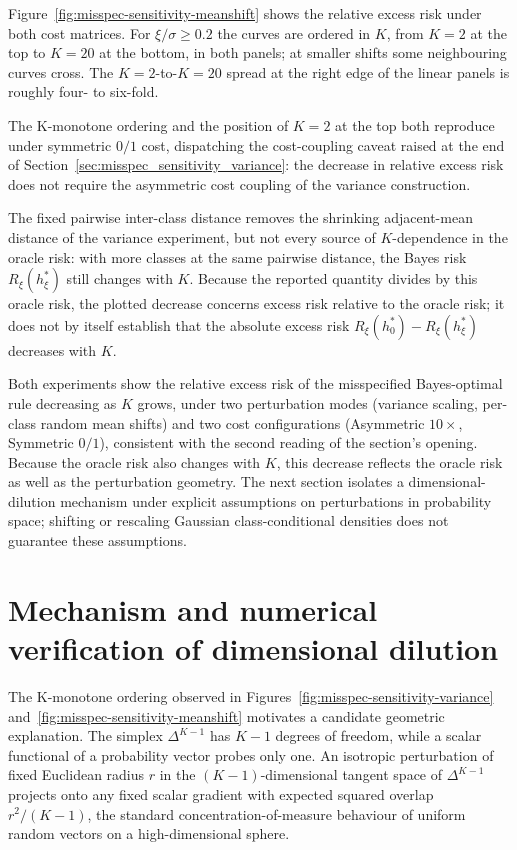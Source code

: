 Figure~\ref{fig:misspec-sensitivity-meanshift} shows the relative excess risk under both cost matrices. For $\xi/\sigma \ge 0.2$ the curves are ordered in $K$, from $K = 2$ at the top to $K = 20$ at the bottom, in both panels; at smaller shifts some neighbouring curves cross. The $K=2$-to-$K=20$ spread at the right edge of the linear panels is roughly four- to six-fold.

The K-monotone ordering and the position of $K = 2$ at the top both reproduce under symmetric $0/1$ cost, dispatching the cost-coupling caveat raised at the end of Section~\ref{sec:misspec_sensitivity_variance}: the decrease in relative excess risk does not require the asymmetric cost coupling of the variance construction.

The fixed pairwise inter-class distance removes the shrinking adjacent-mean distance of the variance experiment, but not every source of $K$-dependence in the oracle risk: with more classes at the same pairwise distance, the Bayes risk $R_\xi(h^*_\xi)$ still changes with $K$. Because the reported quantity divides by this oracle risk, the plotted decrease concerns excess risk relative to the oracle risk; it does not by itself establish that the absolute excess risk $R_\xi(h^*_0) - R_\xi(h^*_\xi)$ decreases with $K$.

Both experiments show the relative excess risk of the misspecified Bayes-optimal rule decreasing as $K$ grows, under two perturbation modes (variance scaling, per-class random mean shifts) and two cost configurations (Asymmetric $10\times$, Symmetric $0/1$), consistent with the second reading of the section's opening. Because the oracle risk also changes with $K$, this decrease reflects the oracle risk as well as the perturbation geometry. The next section isolates a dimensional-dilution mechanism under explicit assumptions on perturbations in probability space; shifting or rescaling Gaussian class-conditional densities does not guarantee these assumptions.

\section{Mechanism and numerical verification of dimensional dilution}\label{sec:misspec_sensitivity_mechanism}

The K-monotone ordering observed in Figures~\ref{fig:misspec-sensitivity-variance} and~\ref{fig:misspec-sensitivity-meanshift} motivates a candidate geometric explanation. The simplex $\Delta^{K-1}$ has $K-1$ degrees of freedom, while a scalar functional of a probability vector probes only one. An isotropic perturbation of fixed Euclidean radius $r$ in the $(K-1)$-dimensional tangent space of $\Delta^{K-1}$ projects onto any fixed scalar gradient with expected squared overlap $r^2/(K-1)$, the standard concentration-of-measure behaviour of uniform random vectors on a high-dimensional sphere.


